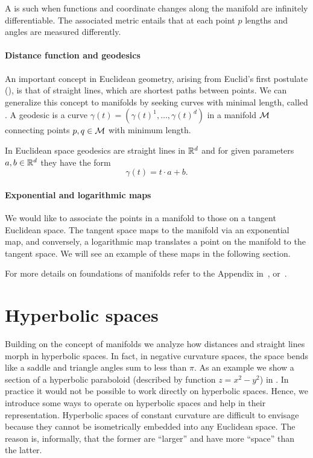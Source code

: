 A  is such when functions and coordinate changes along the manifold are infinitely differentiable. The associated metric entails that at each point $p$ lengths and angles are measured differently. 

\paragraph{Distance function and geodesics} An important concept in Euclidean geometry, arising from Euclid's first postulate (), is that of straight lines, which are shortest paths between points. We can generalize this concept to manifolds by seeking curves with minimal length, called . A geodesic is a curve $\gamma(t)=(\gamma(t)^1, \dots, \gamma(t)^d)$ in a manifold $\mathcal{M}$ connecting points $p,q\in \mathcal{M}$ with minimum length. 

In Euclidean space geodesics are straight lines in $\mathbb{R}^d$ and for given parameters $a,b\in \mathbb{R}^d$ they have the form 
\begin{equation}
    \gamma(t) = t\cdot a + b.
\end{equation}

\paragraph{Exponential and logarithmic maps} We would like to associate the points in a manifold to those on a tangent Euclidean space. The tangent space maps to the manifold via an exponential map, and conversely, a logarithmic map translates a point on the manifold to the tangent space. We will see an example of these maps in the following section.

For more details on foundations of manifolds refer to the Appendix in~\cite{Chami2021representationLearningAlgorithmsHyperbolicSpaces}, or~\cite{doCarmo1992riemannianGeometry}\cite{Lee2003smooth}.


\section{Hyperbolic spaces}
Building on the concept of manifolds we analyze how distances and straight lines morph in hyperbolic spaces. In fact, in negative curvature spaces, the space bends like a saddle and triangle angles sum to less than $\pi$. As an example we show a section of a hyperbolic paraboloid (described by function $z=x^2-y^2$) in . In practice it would not be possible to work directly on hyperbolic spaces. Hence, we introduce some ways to operate on hyperbolic spaces and help in their representation. Hyperbolic spaces of constant curvature are difficult to envisage because they cannot be isometrically embedded into any Euclidean space. The reason is, informally, that the former are ``larger'' and have more ``space'' than the latter.  

